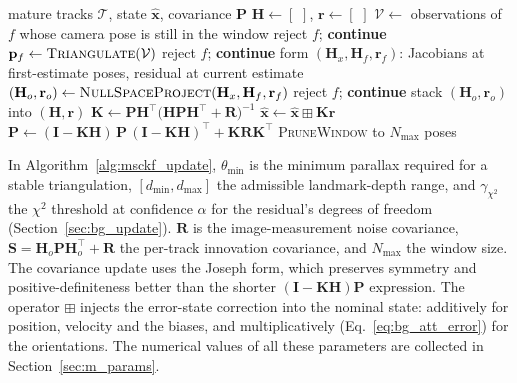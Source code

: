 \begin{algorithm}[htbp]
\caption{MSCKF measurement update (one image).}
\label{alg:msckf_update}
\begin{algorithmic}[1]
\Require mature tracks $\mathcal{T}$, state $\hat{\mathbf{x}}$, covariance $\mathbf{P}$
\State $\mathbf{H} \gets [\,\,]$, \quad $\mathbf{r} \gets [\,\,]$ 
    \State $\mathcal{V} \gets$ observations of $f$ whose camera pose is still in the window
        \State reject $f$; \textbf{continue}
    \EndIf
    \State $\mathbf{p}_f \gets \textsc{Triangulate}(\mathcal{V})$ 
        \State reject $f$; \textbf{continue}
    \EndIf
    \State form $(\mathbf{H}_x, \mathbf{H}_f, \mathbf{r}_f)$: Jacobians at first-estimate poses, residual at current estimate
    \State $(\mathbf{H}_o, \mathbf{r}_o) \gets \textsc{NullSpaceProject}(\mathbf{H}_x, \mathbf{H}_f, \mathbf{r}_f)$
        \State reject $f$; \textbf{continue} 
    \EndIf
    \State stack $(\mathbf{H}_o, \mathbf{r}_o)$ into $(\mathbf{H}, \mathbf{r})$
\EndFor
{} \Return \EndIf
\State $\mathbf{K} \gets \mathbf{P}\mathbf{H}^{\top}\big(\mathbf{H}\mathbf{P}\mathbf{H}^{\top} + \mathbf{R}\big)^{-1}$ 
\State $\hat{\mathbf{x}} \gets \hat{\mathbf{x}} \boxplus \mathbf{K}\mathbf{r}$ 
\State $\mathbf{P} \gets (\mathbf{I} - \mathbf{K}\mathbf{H})\,\mathbf{P}\,(\mathbf{I} - \mathbf{K}\mathbf{H})^{\top} + \mathbf{K}\mathbf{R}\mathbf{K}^{\top}$ 
\State \textsc{PruneWindow} to $N_{\max}$ poses
\end{algorithmic}
\end{algorithm}

In Algorithm~\ref{alg:msckf_update}, $\theta_{\min}$ is the minimum parallax required for a stable triangulation, $[d_{\min}, d_{\max}]$ the admissible landmark-depth range, and $\gamma_{\chi^2}$ the $\chi^2$ threshold at confidence $\alpha$ for the residual's degrees of freedom (Section~\ref{sec:bg_update}). $\mathbf{R}$ is the image-measurement noise covariance, $\mathbf{S} = \mathbf{H}_o\mathbf{P}\mathbf{H}_o^{\top} + \mathbf{R}$ the per-track innovation covariance, and $N_{\max}$ the window size. The covariance update uses the Joseph form, which preserves symmetry and positive-definiteness better than the shorter $(\mathbf{I}-\mathbf{K}\mathbf{H})\mathbf{P}$ expression. The operator $\boxplus$ injects the error-state correction into the nominal state: additively for position, velocity and the biases, and multiplicatively (Eq.~\ref{eq:bg_att_error}) for the orientations. The numerical values of all these parameters are collected in Section~\ref{sec:m_params}.

